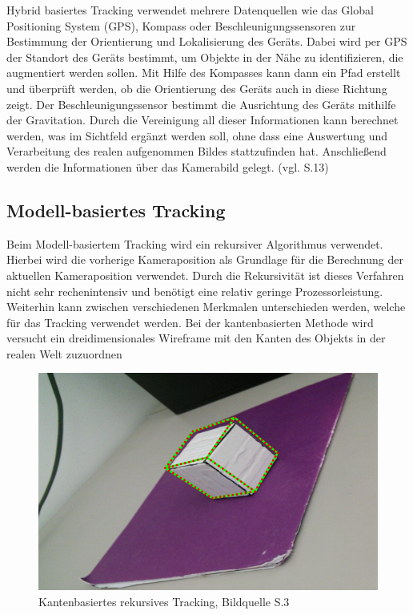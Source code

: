 Hybrid basiertes Tracking verwendet mehrere Datenquellen wie das Global Positioning System (GPS), Kompass oder Beschleunigungssensoren zur Bestimmung der Orientierung und Lokalisierung des Geräts. Dabei wird per GPS der Standort des Geräts bestimmt, um Objekte in der Nähe zu identifizieren, die augmentiert werden sollen. Mit Hilfe des Kompasses kann dann ein Pfad erstellt und überprüft werden, ob die Orientierung des Geräts auch in diese Richtung zeigt. Der Beschleunigungssensor bestimmt die Ausrichtung des Geräts mithilfe der Gravitation. Durch die Vereinigung all dieser Informationen kann berechnet werden, was im Sichtfeld ergänzt werden soll, ohne dass eine Auswertung und Verarbeitung des realen aufgenommen Bildes stattzufinden hat. Anschließend werden die Informationen über das Kamerabild gelegt.  (vgl. \cite{comparative_sdks} S.13)

\subsection{Modell-basiertes Tracking}

Beim Modell-basiertem Tracking wird ein rekursiver Algorithmus verwendet. Hierbei wird die vorherige Kameraposition als Grundlage für die Berechnung der aktuellen Kameraposition verwendet. Durch die Rekursivität ist dieses Verfahren nicht sehr rechenintensiv und benötigt eine relativ geringe Prozessorleistung. Weiterhin kann zwischen verschiedenen Merkmalen unterschieden werden, welche für das Tracking verwendet werden. Bei der kantenbasierten Methode wird versucht ein dreidimensionales Wireframe mit den Kanten des Objekts in der realen Welt zuzuordnen

\begin{figure}[H]
	\centering
	\includegraphics[scale=0.7]{wire.png}
	\caption{Kantenbasiertes rekursives Tracking, Bildquelle \cite{model_based} S.3}
\end{figure} 

